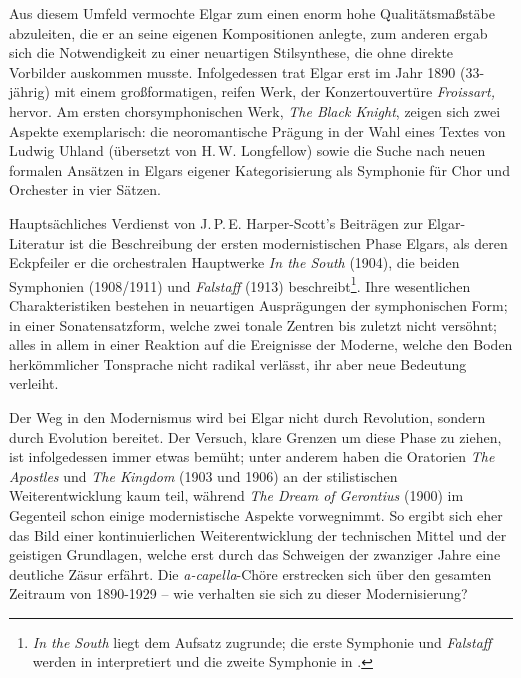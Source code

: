\documentclass[a4paper,11pt,open=any]{scrbook}
\begin{document}
Aus diesem Umfeld vermochte Elgar zum einen enorm hohe Qualitätsmaßstäbe
abzuleiten, die er an seine eigenen Kompositionen anlegte, zum anderen ergab
sich die Notwendigkeit zu einer neuartigen Stilsynthese, die ohne direkte
Vorbilder auskommen musste.  Infolgedessen trat Elgar erst im Jahr 1890
(33-jährig) mit einem großformatigen, reifen Werk, der Konzertouvertüre
\textit{Frois\-sart,} hervor.  Am ersten chorsymphonischen Werk, \textit{The
Black Knight}, zeigen sich zwei Aspekte exemplarisch: die neoromantische
Prägung in der Wahl eines Textes von Ludwig Uhland (übersetzt von H.\,W.
Longfellow) sowie die Suche nach neuen formalen Ansätzen in Elgars eigener
Kategorisierung als Symphonie für Chor und Orchester in vier Sätzen.

Hauptsächliches Verdienst von J.\,P.\,E. Harper-Scott’s Beiträgen zur
Elgar-Literatur ist die Beschreibung der ersten modernistischen Phase Elgars,
als deren Eckpfeiler er die orchestralen Hauptwerke \textit{In the
South} (1904), die beiden Symphonien (1908/1911) und \textit{Falstaff}
(1913) beschreibt\footnote{\textit{In the South} liegt dem Aufsatz
\cite{harperscott2013} zugrunde; die erste Symphonie und \textit{Falstaff}
werden in \cite{harperscott2006} interpretiert und die zweite Symphonie in
\cite{harperscott2007}.}.  Ihre wesentlichen Charakteristiken bestehen in
neuartigen Ausprägungen der symphonischen Form; in einer Sonatensatzform,
welche zwei tonale Zentren bis zuletzt nicht versöhnt; alles in allem in einer
Reaktion auf die Ereignisse der Moderne, welche den Boden herkömmlicher
Tonsprache nicht radikal verlässt, ihr aber neue Bedeutung verleiht.

Der Weg in den Modernismus wird bei Elgar nicht durch Revolution, sondern
durch Evolution bereitet.  Der Versuch, klare Grenzen um diese Phase zu
ziehen, ist infolgedessen immer etwas bemüht; unter anderem haben die
Oratorien \textit{The Apostles} und \textit{The Kingdom} (1903 und 1906)
an der stilistischen Weiterentwicklung kaum teil, während \textit{The Dream
of Gerontius} (1900) im Gegenteil schon einige modernistische Aspekte
vorwegnimmt\cite[S.~14f.]{harperscott2006}.  So ergibt sich eher das Bild
einer kontinuierlichen Weiterentwicklung der technischen Mittel und der
geistigen Grundlagen, welche erst durch das Schweigen der zwanziger Jahre
eine deutliche Zäsur erfährt.  Die \textit{a-capella}-Chöre erstrecken sich
über den gesamten Zeitraum von 1890-1929 – wie verhalten sie sich zu dieser
Modernisierung?
\end{document}
